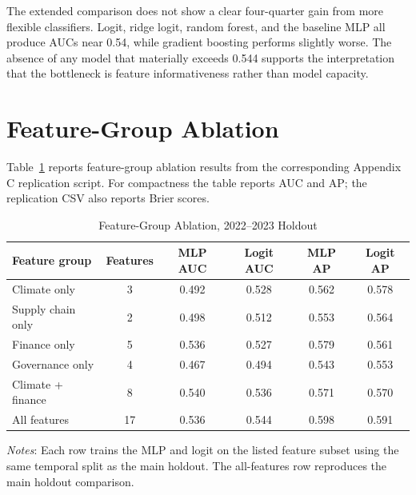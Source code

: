 \documentclass[12pt]{article}
\begin{document}
The extended comparison does not show a clear four-quarter gain from more
flexible classifiers.  Logit, ridge logit, random forest, and the baseline MLP
all produce AUCs near 0.54, while gradient boosting performs slightly worse.
The absence of any model that materially exceeds 0.544 supports the
interpretation that the bottleneck is feature informativeness rather than
model capacity.

\section{Feature-Group Ablation}\label{app:ablation}

Table~\ref{tab:appendix_ablation} reports feature-group ablation results from
the corresponding Appendix C replication script.  For compactness the table
reports AUC and AP; the replication CSV also reports Brier scores.

\begin{table}[H]
\centering
\caption{Feature-Group Ablation, 2022--2023 Holdout}\label{tab:appendix_ablation}
\begin{threeparttable}
\small
\begin{tabular}{lccccc}
\toprule
Feature group & Features & MLP AUC & Logit AUC & MLP AP & Logit AP \\
\midrule
Climate only       & 3  & 0.492 & 0.528 & 0.562 & 0.578 \\
Supply chain only  & 2  & 0.498 & 0.512 & 0.553 & 0.564 \\
Finance only       & 5  & 0.536 & 0.527 & 0.579 & 0.561 \\
Governance only    & 4  & 0.467 & 0.494 & 0.543 & 0.553 \\
Climate + finance  & 8  & 0.540 & 0.536 & 0.571 & 0.570 \\
All features       & 17 & 0.536 & 0.544 & 0.598 & 0.591 \\
\bottomrule
\end{tabular}
\begin{tablenotes}
  \small
  \item \textit{Notes}: Each row trains the MLP and logit on the listed
  feature subset using the same temporal split as the main holdout.  The
  all-features row reproduces the main holdout comparison.
\end{tablenotes}
\end{threeparttable}
\end{table}
\end{document}
